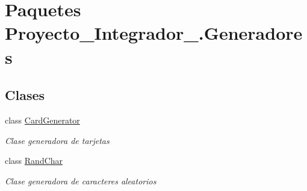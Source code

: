 \hypertarget{namespace_proyecto___integrador__3_1_1_generadores}{\section{Paquetes Proyecto\-\_\-\-Integrador\-\_.\-Generadores}
\label{namespace_proyecto___integrador__3_1_1_generadores}
}
\subsection*{Clases}
\begin{DoxyCompactItemize}
\item 
class \hyperlink{class_proyecto___integrador__3_1_1_generadores_1_1_card_generator}{Card\-Generator}
\begin{DoxyCompactList}\small\item\em Clase generadora de tarjetas \end{DoxyCompactList}\item 
class \hyperlink{class_proyecto___integrador__3_1_1_generadores_1_1_rand_char}{Rand\-Char}
\begin{DoxyCompactList}\small\item\em Clase generadora de caracteres aleatorios \end{DoxyCompactList}\end{DoxyCompactItemize}
